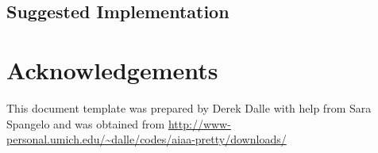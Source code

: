 \documentclass{aer1315-pretty}
\begin{document}
\subsection{Suggested Implementation} \label{ssec:implementation}  

                       
%


\section*{Acknowledgements}
This document template was prepared by Derek Dalle with help from Sara Spangelo and was obtained from \url{http://www-personal.umich.edu/~dalle/codes/aiaa-pretty/downloads/}  



\end{document}
